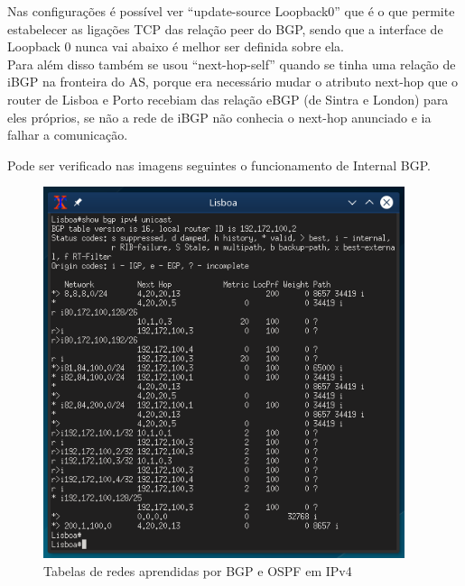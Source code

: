 \documentclass[11pt,a4paper]{report}
\begin{document}
Nas configurações é possível ver ``update-source Loopback0'' que é o que permite estabelecer as ligações TCP das relação peer do BGP, sendo que a interface de Loopback 0 nunca vai abaixo é melhor ser definida sobre ela.\\

Para além disso também se usou ``next-hop-self'' quando se tinha uma relação de iBGP na fronteira do AS, porque era necessário mudar o atributo next-hop que o router de Lisboa e Porto recebiam das relação eBGP (de Sintra e London) para eles próprios, se não a rede de iBGP não conhecia o next-hop anunciado e ia falhar a comunicação.

Pode ser verificado nas imagens seguintes o funcionamento de Internal BGP.

\begin{figure}[H]
\centerline{\includegraphics[width=300pt]{lisboa_bgp_ipv4.png}}
\caption{Tabelas de redes aprendidas por BGP e OSPF em IPv4}
\label{schema}
\end{figure}
\end{document}
